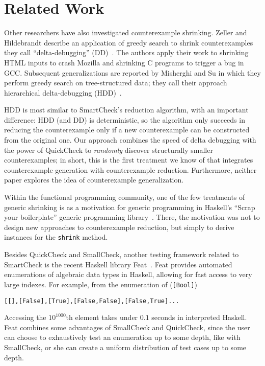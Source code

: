 \documentclass{sigplanconf}
\newenvironment{code}{\begin{alltt}\footnotesize}{\end{alltt}}
\newcommand{\ttp}[1]{\texttt{#1}}
\begin{document}
\section{Related Work}\label{sec:related}

Other researchers have also investigated counterexample shrinking.  Zeller
and Hildebrandt describe an application of greedy search to shrink
counterexamples they call ``delta-debugging'' (DD)~\cite{dd}.  The authors apply
their work to shrinking HTML inputs to crash Mozilla and shrinking C programs to
trigger a bug in GCC.  Subsequent generalizations are reported by Misherghi and
Su in which they perform greedy search on tree-structured data; they call their
approach hierarchical delta-debugging (HDD)~\cite{hdd}.

HDD is most similar to SmartCheck's reduction algorithm, with an important
difference: HDD (and DD) is deterministic, so the algorithm only succeeds in
reducing the counterexample only if a new counterexample can be constructed from
the original one.  Our approach combines the speed of delta debugging with the
power of QuickCheck to \emph{randomly} discover structurally smaller
counterexamples; in short, this is the first treatment we know of that
integrates counterexample generation with counterexample reduction.
Furthermore, neither paper explores the idea of counterexample generalization.

Within the functional programming community, one of the few treatments of
generic shrinking is as a motivation for generic programming in Haskell's
``Scrap your boilerplate'' generic programming library~\cite{syb}.  There, the
motivation was not to design new approaches to counterexample reduction, but
simply to derive instances for the \ttp{shrink} method.

Besides QuickCheck and SmallCheck, another testing framework related to
SmartCheck is the recent Haskell library Feat~\cite{feat}.  Feat provides
automated enumerations of algebraic data types in Haskell, allowing for fast
access to very large indexes.  For example, from the enumeration of
(\ttp{[Bool]})
%
\begin{code}
[[],[False],[True],[False,False],[False,True] ...
\end{code}
%
\noindent
Accessing the $10^{1000}$th element takes under $0.1$ seconds in interpreted
Haskell.  Feat combines some advantages of SmallCheck and QuickCheck, since the
user can choose to exhaustively test an enumeration up to some depth, like with
SmallCheck, or she can create a uniform distribution of test cases up to some
depth.
\end{document}

